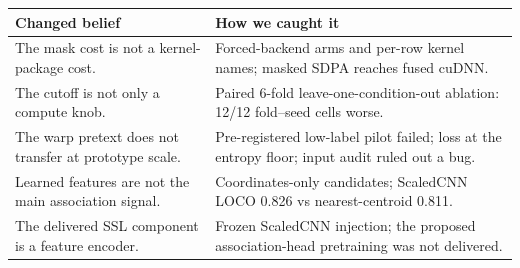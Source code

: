 %

\begin{frame}
  \centering
  \scriptsize
  \renewcommand{\arraystretch}{1.30}
  \setlength{\tabcolsep}{1.8mm}
  \begin{tabular}{@{}p{53mm}>{\raggedright\arraybackslash}p{83mm}@{}}
    \toprule
    \textbf{Changed belief} & \textbf{How we caught it}\\
    \midrule
    The mask cost is not a kernel-package cost. &
    Forced-backend arms and per-row kernel names; masked SDPA reaches fused cuDNN.\\
    The cutoff is not only a compute knob. &
    Paired 6-fold leave-one-condition-out ablation: 12/12 fold--seed cells worse.\\
    The warp pretext does not transfer at prototype scale. &
    Pre-registered low-label pilot failed; loss at the entropy floor; input audit ruled out a bug.\\
    Learned features are not the main association signal. &
    Coordinates-only candidates; ScaledCNN LOCO 0.826 vs nearest-centroid 0.811.\\
    The delivered SSL component is a feature encoder. &
    Frozen ScaledCNN injection; the proposed association-head pretraining was not delivered.\\
    \bottomrule
  \end{tabular}
\end{frame}

